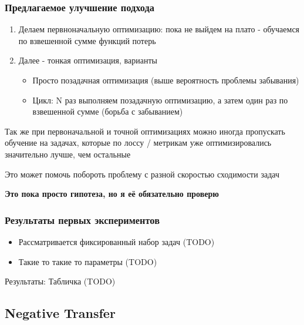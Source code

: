\documentclass[aspectratio=169]{beamer}
\begin{document}
\begin{frame}
	\frametitle{Предлагаемое улучшение подхода}
	\begin{enumerate}
	  \item Делаем первноначальную оптимизацию: пока не выйдем на плато - обучаемся по взвешенной сумме функций потерь
	  \item Далее - тонкая оптимизация, варианты
	  \begin{itemize}
	  	\item Просто позадачная оптимизация (выше вероятность проблемы забывания)
	  	\item Цикл: N раз выполняем позадачную оптимизацию, а затем один раз по взвешенной сумме (борьба с забыванием)
	  \end{itemize}
	\end{enumerate}
	Так же при первоначальной и точной оптимизациях можно иногда пропускать обучение на задачах, которые по лоссу / метрикам уже оптимизировались значительно лучше, чем остальные

	Это может помочь побороть проблему с разной скоростью сходимости задач

	\textbf{Это пока просто гипотеза, но я её обязательно проверю}
\end{frame}

\begin{frame}
	\frametitle{Результаты первых экспериментов}
		\begin{itemize}
		\item Рассматривается фиксированный набор задач (TODO)
		\item Такие то такие то параметры (TODO)
	\end{itemize}
	Результаты:
	Табличка (TODO)
\end{frame}

\subsection{Negative Transfer}
\end{document}

